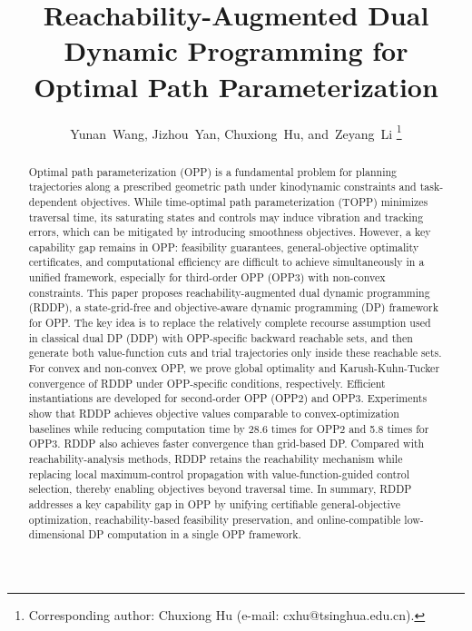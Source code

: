 \documentclass[journal]{IEEEtran}
\theoremstyle{definition}
\theoremstyle{definition}
\begin{document}
\title{Reachability-Augmented Dual Dynamic Programming for Optimal Path Parameterization}

\author{
    Yunan~Wang,
    Jizhou~Yan,
    Chuxiong~Hu,
    and~Zeyang~Li
\thanks{Corresponding author: Chuxiong Hu (e-mail: cxhu@tsinghua.edu.cn).}
}

\maketitle

\begin{abstract}
    Optimal path parameterization (OPP) is a fundamental problem for planning trajectories along a prescribed geometric path under kinodynamic constraints and task-dependent objectives. While time-optimal path parameterization (TOPP) minimizes traversal time, its saturating states and controls may induce vibration and tracking errors, which can be mitigated by introducing smoothness objectives. However, a key capability gap remains in OPP: feasibility guarantees, general-objective optimality certificates, and computational efficiency are difficult to achieve simultaneously in a unified framework, especially for third-order OPP (OPP3) with non-convex constraints. This paper proposes reachability-augmented dual dynamic programming (RDDP), a state-grid-free and objective-aware dynamic programming (DP) framework for OPP. The key idea is to replace the relatively complete recourse assumption used in classical dual DP (DDP) with OPP-specific backward reachable sets, and then generate both value-function cuts and trial trajectories only inside these reachable sets. For convex and non-convex OPP, we prove global optimality and Karush-Kuhn-Tucker convergence of RDDP under OPP-specific conditions, respectively. Efficient instantiations are developed for second-order OPP (OPP2) and OPP3. Experiments show that RDDP achieves objective values comparable to convex-optimization baselines while reducing computation time by 28.6 times for OPP2 and 5.8 times for OPP3. RDDP also achieves faster convergence than grid-based DP. Compared with reachability-analysis methods, RDDP retains the reachability mechanism while replacing local maximum-control propagation with value-function-guided control selection, thereby enabling objectives beyond traversal time. In summary, RDDP addresses a key capability gap in OPP by unifying certifiable general-objective optimization, reachability-based feasibility preservation, and online-compatible low-dimensional DP computation in a single OPP framework.
\end{abstract}
\end{document}
